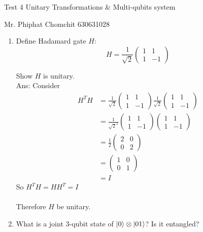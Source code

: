 \documentclass[12pt, a4paper]{article}
\begin{document}
	\begin{center}
		Test 4  Unitary Transformations \& Multi-qubits system
	\end{center}
	
	Mr. Phiphat Chomchit 630631028
	\begin{enumerate}
		\item Define Hadamard gate $H$:
		\begin{equation*}
			H = \frac{1}{\sqrt{2}}\begin{pmatrix}
			1 & 1\\
			1 & -1
		\end{pmatrix}
		\end{equation*}
		
		Show $H$ is unitary.\\
		
		Ans: Consider
		\begin{align*}
			H^T H &=  \frac{1}{\sqrt{2}}
			\begin{pmatrix}
				1 & 1\\
				1 & -1
			\end{pmatrix}
			 \frac{1}{\sqrt{2}}
			 \begin{pmatrix}
				1 & 1\\
				1 & -1
			\end{pmatrix}\\
				& = \frac{1}{\sqrt{2}^2}
						\begin{pmatrix}
							1 & 1\\
							1 & -1
						\end{pmatrix}
						\begin{pmatrix}
							1 & 1\\
							1 & -1
						\end{pmatrix}\\
				& = \frac{1}{2} 
						\begin{pmatrix}
							2 & 0\\
							0 & 2
						\end{pmatrix}\\
				& = \begin{pmatrix}
					1 & 0\\
					0 & 1
				\end{pmatrix}\\	
			    & = I
		\end{align*}
	So $H^TH = HH^T = I$\\\\
	Therefore $H$ be unitary.
	\item What is a joint 3-qubit state of $\ket{0}\otimes \ket{01}$? Is it entangled?\\

\end{enumerate}
\end{document}
